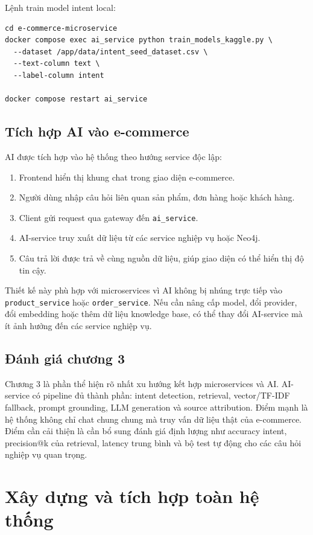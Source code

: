 \documentclass[12pt,a4paper]{report}
\begin{document}
Lệnh train model intent local:
\begin{lstlisting}[style=code,caption={Train local neural intent classifier}]
cd e-commerce-microservice
docker compose exec ai_service python train_models_kaggle.py \
  --dataset /app/data/intent_seed_dataset.csv \
  --text-column text \
  --label-column intent

docker compose restart ai_service
\end{lstlisting}

\section{Tích hợp AI vào e-commerce}
AI được tích hợp vào hệ thống theo hướng service độc lập:
\begin{enumerate}
  \item Frontend hiển thị khung chat trong giao diện e-commerce.
  \item Người dùng nhập câu hỏi liên quan sản phẩm, đơn hàng hoặc khách hàng.
  \item Client gửi request qua gateway đến \texttt{ai\_service}.
  \item AI-service truy xuất dữ liệu từ các service nghiệp vụ hoặc Neo4j.
  \item Câu trả lời được trả về cùng nguồn dữ liệu, giúp giao diện có thể hiển thị độ tin cậy.
\end{enumerate}

Thiết kế này phù hợp với microservices vì AI không bị nhúng trực tiếp vào \texttt{product\_service} hoặc \texttt{order\_service}. Nếu cần nâng cấp model, đổi provider, đổi embedding hoặc thêm dữ liệu knowledge base, có thể thay đổi AI-service mà ít ảnh hưởng đến các service nghiệp vụ.

\section{Đánh giá chương 3}
Chương 3 là phần thể hiện rõ nhất xu hướng kết hợp microservices và AI. AI-service có pipeline đủ thành phần: intent detection, retrieval, vector/TF-IDF fallback, prompt grounding, LLM generation và source attribution. Điểm mạnh là hệ thống không chỉ chat chung chung mà truy vấn dữ liệu thật của e-commerce. Điểm cần cải thiện là cần bổ sung đánh giá định lượng như accuracy intent, precision@k của retrieval, latency trung bình và bộ test tự động cho các câu hỏi nghiệp vụ quan trọng.

\chapter{Xây dựng và tích hợp toàn hệ thống}
\end{document}
